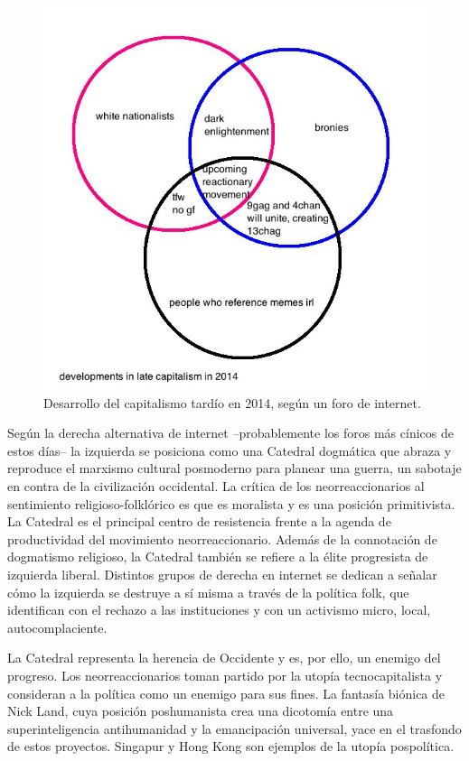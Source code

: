 \begin{figure}[htb]
  \centering
  \includegraphics[width=0.7\linewidth]{images/internet-capitalism-2014.png}
  \caption{Desarrollo del capitalismo tardío en 2014, según un foro de internet.}
  \label{fig:capitalism2014}
\end{figure}

Según la derecha alternativa de internet --probablemente los foros más cínicos de estos días-- la izquierda se posiciona como una Catedral dogmática que abraza y reproduce el marxismo cultural posmoderno para planear una guerra, un sabotaje en contra de la civilización occidental. La crítica de los neorreaccionarios al sentimiento religioso-folklórico es que es moralista y es una posición primitivista. La Catedral es el principal centro de resistencia frente a la agenda de productividad del movimiento neorreaccionario. Además de la connotación de dogmatismo religioso, la Catedral también se refiere a la élite progresista de izquierda liberal. Distintos grupos de derecha en internet se dedican a señalar cómo la izquierda se destruye a sí misma a través de la política folk, que identifican con el rechazo a las instituciones y con un activismo micro, local, autocomplaciente.

La Catedral representa la herencia de Occidente y es, por ello, un enemigo del progreso. Los neorreaccionarios toman partido por la utopía tecnocapitalista y consideran a la política como un enemigo para sus fines. La fantasía biónica de Nick Land, cuya posición poshumanista crea una dicotomía entre una superinteligencia antihumanidad y la emancipación universal, yace en el trasfondo de estos proyectos. Singapur y Hong Kong son ejemplos de la utopía pospolítica.


